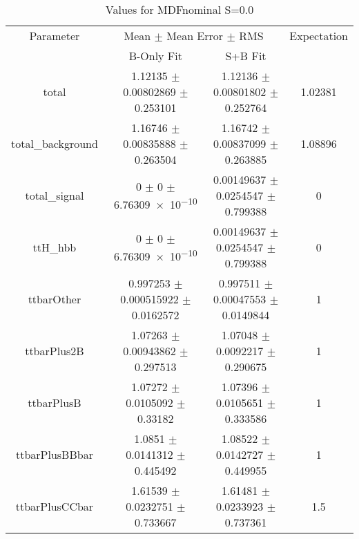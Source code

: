 \begin{table}
\centering
\caption{Values for MDFnominal S=0.0}
\begin{tabular}{cccc}
\toprule
Parameter & \multicolumn{2}{c}{Mean $\pm$ Mean Error $\pm$ RMS} & Expectation\\
 & B-Only Fit & S+B Fit & \\
\midrule
total & \num{1.12135} $\pm$ \num{0.00802869} $\pm$ \num{0.253101} & \num{1.12136} $\pm$ \num{0.00801802} $\pm$ \num{0.252764} & \num{1.02381}\\
total\_background & \num{1.16746} $\pm$ \num{0.00835888} $\pm$ \num{0.263504} & \num{1.16742} $\pm$ \num{0.00837099} $\pm$ \num{0.263885} & \num{1.08896}\\
total\_signal & \num{0} $\pm$ \num{0} $\pm$ \num{6.76309e-10} & \num{0.00149637} $\pm$ \num{0.0254547} $\pm$ \num{0.799388} & \num{0}\\
ttH\_hbb & \num{0} $\pm$ \num{0} $\pm$ \num{6.76309e-10} & \num{0.00149637} $\pm$ \num{0.0254547} $\pm$ \num{0.799388} & \num{0}\\
ttbarOther & \num{0.997253} $\pm$ \num{0.000515922} $\pm$ \num{0.0162572} & \num{0.997511} $\pm$ \num{0.00047553} $\pm$ \num{0.0149844} & \num{1}\\
ttbarPlus2B & \num{1.07263} $\pm$ \num{0.00943862} $\pm$ \num{0.297513} & \num{1.07048} $\pm$ \num{0.0092217} $\pm$ \num{0.290675} & \num{1}\\
ttbarPlusB & \num{1.07272} $\pm$ \num{0.0105092} $\pm$ \num{0.33182} & \num{1.07396} $\pm$ \num{0.0105651} $\pm$ \num{0.333586} & \num{1}\\
ttbarPlusBBbar & \num{1.0851} $\pm$ \num{0.0141312} $\pm$ \num{0.445492} & \num{1.08522} $\pm$ \num{0.0142727} $\pm$ \num{0.449955} & \num{1}\\
ttbarPlusCCbar & \num{1.61539} $\pm$ \num{0.0232751} $\pm$ \num{0.733667} & \num{1.61481} $\pm$ \num{0.0233923} $\pm$ \num{0.737361} & \num{1.5}\\
\bottomrule
\end{tabular}
\end{table}